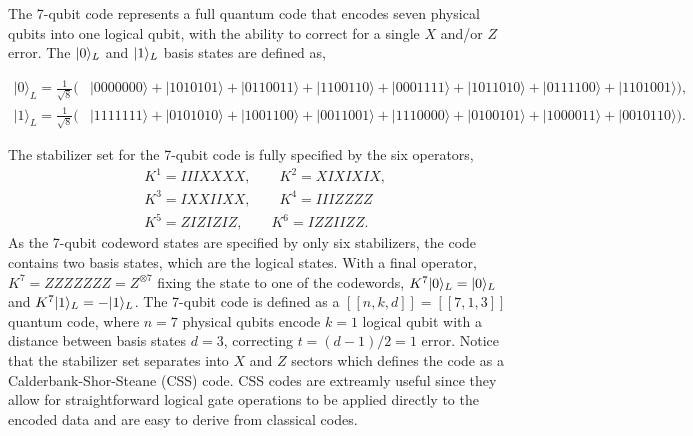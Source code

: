 The 7-qubit code represents a full quantum code that encodes seven physical qubits into one logical qubit, with 
the ability to correct for a single $X$ and/or $Z$ error.  
The $|0\rangle_L$ and $|1\rangle_L$ basis states are 
defined as,
\begin{widetext}
\begin{equation}
\begin{aligned}
|0\rangle_L = \frac{1}{\sqrt{8}}(&|0000000\rangle + |1010101\rangle + |0110011\rangle + |1100110\rangle + 
|0001111\rangle + |1011010\rangle + |0111100\rangle + |1101001\rangle),\\
|1\rangle_L = \frac{1}{\sqrt{8}}(&|1111111\rangle + |0101010\rangle + |1001100\rangle + |0011001\rangle + 
|1110000\rangle + |0100101\rangle + |1000011\rangle + |0010110\rangle).
\label{eq:log}
\end{aligned}
\end{equation}
\end{widetext}
The stabilizer set for the 7-qubit code is fully specified by the six operators,
\begin{equation}
\begin{aligned}
&K^1 = IIIXXXX, \quad \quad K^2 = XIXIXIX,\\ 
&K^3 = IXXIIXX, \quad \quad K^4 = IIIZZZZ \\
&K^5 = ZIZIZIZ, \quad \quad K^6 = IZZIIZZ.
\end{aligned}
\label{eq:stab7}
\end{equation}
As the 7-qubit codeword states are specified by only six stabilizers, the code contains two basis states, 
which are the logical states.  With a final operator, $K^7 = ZZZZZZZ=Z^{\otimes 7}$ 
fixing the state to one of the codewords,
$K^7|0\rangle_L = |0\rangle_L$ and $K^7|1\rangle_L = -|1\rangle_L$.  The 7-qubit code is 
defined as a $[[n,k,d]] = [[7,1,3]]$ 
quantum code, where $n=7$ physical qubits encode $k=1$ logical qubit with a distance between basis states $d=3$, 
correcting $t = (d-1)/2 = 1$ error.  Notice that the stabilizer set separates into $X$ and $Z$ sectors which defines the 
code as a Calderbank-Shor-Steane (CSS) code.  CSS codes are extreamly useful since they allow for straightforward 
logical gate operations to be applied directly to the encoded data 
and are easy to derive from classical codes.

